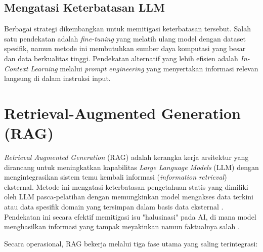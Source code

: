 \subsection{Mengatasi Keterbatasan LLM}
Berbagai strategi dikembangkan untuk memitigasi keterbatasan tersebut. Salah satu pendekatan adalah \textit{fine-tuning} yang melatih ulang model dengan dataset spesifik, namun metode ini membutuhkan sumber daya komputasi yang besar dan data berkualitas tinggi. Pendekatan alternatif yang lebih efisien adalah \textit{In-Context Learning} melalui \textit{prompt engineering} yang menyertakan informasi relevan langsung di dalam instruksi input.

\section{Retrieval-Augmented Generation (RAG)}
\textit{Retrieval Augmented Generation} (RAG) adalah kerangka kerja arsitektur yang dirancang untuk meningkatkan kapabilitas \textit{Large Language Models} (LLM) dengan mengintegrasikan sistem temu kembali informasi (\textit{information retrieval}) eksternal. Metode ini mengatasi keterbatasan pengetahuan statis yang dimiliki oleh LLM pasca-pelatihan dengan memungkinkan model mengakses data terkini atau data spesifik domain yang tersimpan dalam basis data eksternal \parencite{Gao2023Retrieval}. Pendekatan ini secara efektif memitigasi isu "halusinasi" pada AI, di mana model menghasilkan informasi yang tampak meyakinkan namun faktualnya salah \parencite{Ji2023Survey}.

Secara operasional, RAG bekerja melalui tiga fase utama yang saling terintegrasi:

